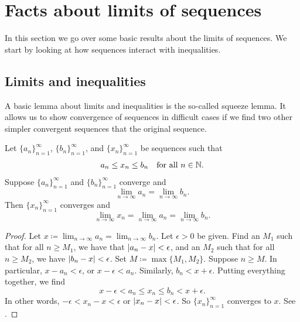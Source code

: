 
\sectionnewpage
\section{Facts about limits of sequences}
\label{sec:factslimsseqs}



In this section we go over some basic results about the limits of
sequences.
We start by looking at how sequences interact with inequalities.

\subsection{Limits and inequalities}

A basic lemma about limits and inequalities is the so-called squeeze lemma.
It allows us to show convergence of sequences in difficult cases
if we find two other simpler convergent sequences that 
 the original sequence.

\begin{lemma} \label{squeeze:lemma}
Let $\{ a_n \}_{n=1}^\infty$, 
$\{ b_n \}_{n=1}^\infty$, and 
$\{ x_n \}_{n=1}^\infty$ be sequences such that
\begin{equation*}
a_n \leq x_n \leq b_n \quad \text{for all } n \in {\mathbb{N}}.
\end{equation*}
Suppose $\{ a_n \}_{n=1}^\infty$ and $\{ b_n \}_{n=1}^\infty$ converge and
\begin{equation*}
\lim_{n\to \infty} a_n
=
\lim_{n\to \infty} b_n .
\end{equation*}
Then $\{ x_n \}_{n=1}^\infty$ converges and
\begin{equation*}
\lim_{n\to \infty} x_n
=
\lim_{n\to \infty} a_n
=
\lim_{n\to \infty} b_n .
\end{equation*}
\end{lemma}

\begin{proof}
Let $x \coloneqq \lim_{n\to\infty} a_n = \lim_{n\to\infty} b_n$.
Let $\epsilon > 0$ be given.
Find an $M_1$ such that for all $n \geq M_1$, we have
that $\left\lvert {a_n-x} \right\rvert < \epsilon$, and an $M_2$
such that for all $n \geq M_2$,
we have $\left\lvert {b_n-x} \right\rvert < \epsilon$.  Set $M \coloneqq \max \{M_1, M_2 \}$.
Suppose $n \geq M$.
In particular,
$x - a_n < \epsilon$, or 
$x - \epsilon < a_n$.  Similarly, $b_n < x + \epsilon$.
Putting everything together, we find
\begin{equation*}
x - \epsilon < a_n \leq x_n \leq b_n < x + \epsilon .
\end{equation*}
In other words, $-\epsilon < x_n-x < \epsilon$ or $\left\lvert {x_n-x} \right\rvert < \epsilon$.
So $\{x_n\}_{n=1}^\infty$ converges to $x$.
See .
\end{proof}

